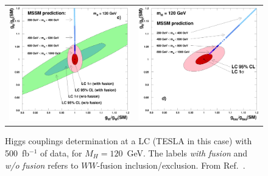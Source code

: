 \documentclass[12pt,prd,onecolumn,aps,floats,superscriptaddress,floatfix,nofootinbib]{revtex4-2}
\begin{document}
\begin{figure}
\begin{tabular}{cc}
\begin{minipage}{0.5\linewidth}
{\includegraphics[scale=0.4]{fig2206c}}
\end{minipage} &
\begin{minipage}{0.5\linewidth}
{\includegraphics[scale=0.4]{fig2206d}}
\end{minipage}
\end{tabular}
\caption[]{Higgs couplings determination at a LC (TESLA in this case) with 500~fb$^{-1}$ of
data, for $M_H\!=\!120$~GeV. The labels \emph{with fusion} and
\emph{w/o fusion} refers to $WW$-fusion inclusion/exclusion. From
Ref.~\cite{Aguilar-Saavedra:2001rg}. \label{fig:higgs_couplings_lc}}
\end{figure}
\end{document}

